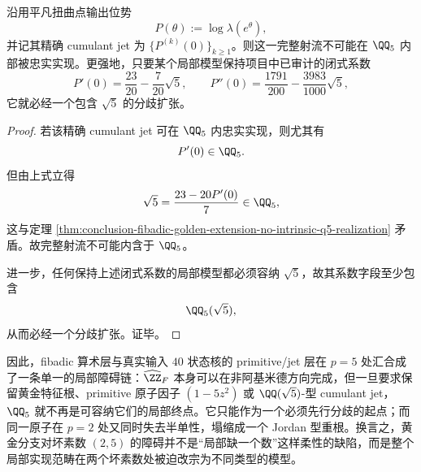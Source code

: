 \begin{theorem}\label{thm:conclusion-realinput40-qsqrtfive-cumulant-jet-escapes-q5}
沿用平凡扭曲点输出位势
\[
P(\theta):=\log\lambda(e^\theta),
\]
并记其精确 cumulant jet 为 \(\{P^{(k)}(0)\}_{k\ge 1}\)。则这一完整射流不可能在 \(\QQ_5\) 内部被忠实实现。更强地，只要某个局部模型保持项目中已审计的闭式系数
\[
P'(0)=\frac{23}{20}-\frac{7}{20}\sqrt5,
\qquad
P''(0)=\frac{1791}{200}-\frac{3983}{1000}\sqrt5,
\]
它就必经一个包含 \(\sqrt5\) 的分歧扩张。
\end{theorem}
\begin{proof}
若该精确 cumulant jet 可在 \(\QQ_5\) 内忠实实现，则尤其有
\[
P'(0)\in\QQ_5.
\]
但由上式立得
\[
\sqrt5=\frac{23-20P'(0)}{7}\in\QQ_5,
\]
这与定理 \ref{thm:conclusion-fibadic-golden-extension-no-intrinsic-q5-realization} 矛盾。故完整射流不可能内含于 \(\QQ_5\)。

进一步，任何保持上述闭式系数的局部模型都必须容纳 \(\sqrt5\)，故其系数字段至少包含
\[
\QQ_5(\sqrt5),
\]
从而必经一个分歧扩张。证毕。
\end{proof}

\noindent
因此，fibadic 算术层与真实输入 \(40\) 状态核的 primitive/jet 层在 \(p=5\) 处汇合成了一条单一的局部障碍链：\(\widehat{\ZZ}_F\) 本身可以在非阿基米德方向完成，但一旦要求保留黄金特征根、primitive 原子因子 \((1-5z^2)\) 或 \(\QQ(\sqrt5)\)-型 cumulant jet，\(\QQ_5\) 就不再是可容纳它们的局部终点。它只能作为一个必须先行分歧的起点；而同一原子在 \(p=2\) 处又同时失去半单性，塌缩成一个 Jordan 型重根。换言之，黄金分支对坏素数 \((2,5)\) 的障碍并不是“局部缺一个数”这样柔性的缺陷，而是整个局部实现范畴在两个坏素数处被迫改宗为不同类型的模型。

\endinput
